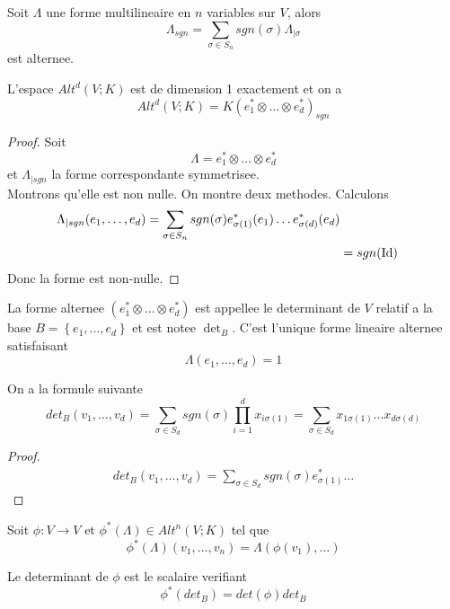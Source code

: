 \documentclass[../main.tex]{subfiles}
\begin{document}
\begin{crly}
Soit $\Lambda$ une forme multilineaire en $n$ variables sur $V$, alors
\[ 
	\Lambda_{sgn} = \sum_{\sigma\in S_n} sgn( \sigma) \Lambda_{|\sigma} 
\]
est alternee.
\end{crly}
\begin{thm}
	L'espace $Alt^{d}( V;K) $ est de dimension 1 exactement et on a 
	\[ 
		Alt^{d}( V;K) = K ( e_1^{*}\otimes \ldots \otimes e_d^{*}) _{sgn} 
	\]
	
\end{thm}
\begin{proof}
	Soit 
	\[ 
	\Lambda= e_1^{*}\otimes \ldots \otimes e_d^{*}
	\]
	et $\Lambda_{|sgn} $ la forme correspondante symmetrisee.\\
	Montrons qu'elle est non nulle.
	On montre deux methodes.
	 Calculons
		\begin{align*}
			\Lambda_{|sgn} ( e_1, \ldots, e_d) = \sum_{\sigma\in S_n} sgn( \sigma) e_{\sigma( 1) } ^{*}( e_1) \ldots e_{\sigma( d) } ^{*}( e_d) \\
			&= sgn( \operatorname*{Id})
		\end{align*}
		Donc la forme est non-nulle.
	

\end{proof}
\begin{defn}
	La forme alternee $( e_1^{*}\otimes \ldots \otimes e_d^{*}) $ est appellee le determinant de $V$ relatif a la base $B= \left\{ e_1, \ldots, e_d \right\} $ et est notee $\det_B$. C'est l'unique forme lineaire alternee satisfaisant
	\[ 
		\Lambda( e_1, \ldots, e_d) = 1
	\]
	
\end{defn}
\begin{propo}
On a la formule suivante
\[ 
	det_B( v_1, \ldots, v_d) = \sum_{\sigma\in S_d} sgn( \sigma) \prod_{i=1}^{d}x_{i\sigma( 1) } = \sum_{\sigma \in S_d} x_{1\sigma( 1) } \ldots x_{d\sigma( d) } 
\]
 
\end{propo}
\begin{proof}
	 \begin{align*}
		 det_B( v_1, \ldots, v_d) 
		 = \sum_{\sigma\in S_d} sgn( \sigma) e_{\sigma( 1) } ^{*}\ldots
	\end{align*}
\end{proof}
Soit $\phi:  V \to V$ et $\phi^{*}( \Lambda) \in Alt^{n}( V;K) $
tel que
\[ 
	\phi^{*}( \Lambda) ( v_1, \ldots, v_n) = \Lambda( \phi( v_1) , \ldots) 
\]
\begin{defn}
Le determinant de $\phi$ est le scalaire verifiant
\[ 
	\phi^{*}( det_B) = det( \phi) det_B
\]

\end{defn}
\end{document}
